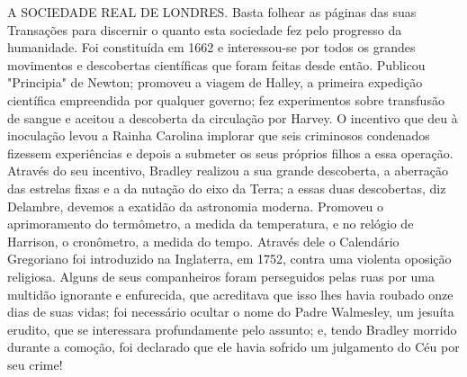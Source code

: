 \documentclass[11pt,a5paper,twoside,openany]{book}
\begin{document}
A SOCIEDADE REAL DE LONDRES. Basta folhear as páginas das suas Transações para discernir o quanto esta sociedade fez pelo progresso da humanidade. Foi constituída em 1662 e interessou-se por todos os grandes movimentos e descobertas científicas que foram feitas desde então. Publicou "Principia" de Newton; promoveu a viagem de Halley, a primeira expedição científica empreendida por qualquer governo; fez experimentos sobre transfusão de sangue e aceitou a descoberta da circulação por Harvey. O incentivo que deu à inoculação levou a Rainha Carolina implorar que seis criminosos condenados fizessem experiências e depois a submeter os seus próprios filhos a essa operação. Através do seu incentivo, Bradley realizou a sua grande descoberta, a aberração das estrelas fixas e a da nutação do eixo da Terra; a essas duas descobertas, diz Delambre, devemos a exatidão da astronomia moderna. Promoveu o aprimoramento do termômetro, a medida da temperatura, e no relógio de Harrison, o cronômetro, a medida do tempo. Através dele o Calendário Gregoriano foi introduzido na Inglaterra, em 1752, contra uma violenta oposição religiosa. Alguns de seus companheiros foram perseguidos pelas ruas por uma multidão ignorante e enfurecida, que acreditava que isso lhes havia roubado onze dias de suas vidas; foi necessário ocultar o nome do Padre Walmesley, um jesuíta erudito, que se interessara profundamente pelo assunto; e, tendo Bradley morrido durante a comoção, foi declarado que ele havia sofrido um julgamento do Céu por seu crime!
\end{document}
